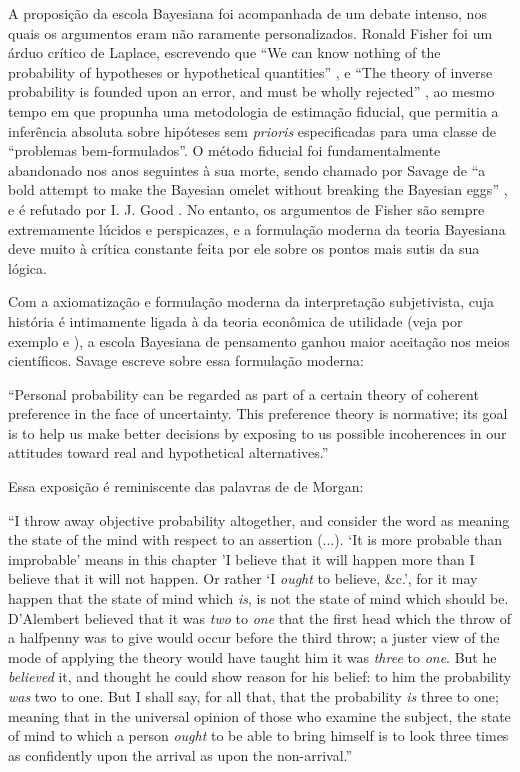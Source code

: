 A proposição da escola Bayesiana foi acompanhada de um debate intenso, nos quais os argumentos eram não raramente personalizados.
Ronald Fisher foi um árduo crítico
de Laplace, escrevendo que ``We can know nothing of the probability of hypotheses or hypothetical quantities'' \citep{Fisher1921},
e ``The theory of inverse probability is founded upon an error, and must be wholly rejected'' \citep{Fisher1925}, ao mesmo tempo
em que propunha uma metodologia de estimação fiducial, que permitia a inferência absoluta sobre hipóteses sem {\em prioris} 
especificadas para uma classe de ``problemas bem-formulados''. O método fiducial foi fundamentalmente abandonado nos anos 
seguintes à sua morte, sendo chamado por Savage de ``a bold attempt to make the Bayesian omelet without
breaking the Bayesian eggs'' \citep{Savage60}, e é refutado por I. J. Good \citep{Good92}. No entanto, os argumentos de Fisher
são sempre extremamente lúcidos e perspicazes, e a formulação moderna da teoria Bayesiana deve muito à crítica constante
feita por ele sobre os pontos mais sutis da sua lógica.

Com a axiomatização e formulação moderna da interpretação subjetivista, cuja história é intimamente ligada à da teoria
econômica de utilidade (veja por exemplo \citep{Friedman48} e \citep{Pfanzagl67}),
a escola Bayesiana de pensamento ganhou maior aceitação nos meios científicos. Savage escreve sobre essa formulação moderna:

``Personal probability can be regarded as part of a certain theory of coherent preference in the face of uncertainty. This
preference theory is normative; its goal is to help us make better decisions by exposing to us possible incoherences in our
attitudes toward real and hypothetical alternatives.'' \citep{Savage67}

Essa exposição é reminiscente das palavras de de Morgan:

``I throw away objective probability altogether, and consider the word as meaning the state of the mind with respect to an 
assertion (...). `It is more probable than improbable' means in this chapter 'I believe that it will happen more than I 
believe that it will not happen. Or rather `I {\em ought} to believe, \&c.', for it may happen that the state of mind which {\em
is}, is not the state of mind which should be. 
D'Alembert believed that it was {\em two} to {\em one} that the first head which the throw of a halfpenny was to give would occur
before the third throw; a juster view of the mode of applying the theory would have taught him it was {\em three} to {\em one}.
But he {\em believed} it, and thought he could show reason for his belief: to him the probability {\em was} two to one. But 
I shall say, for all that, that the probability {\em is} three to one; meaning that in the universal opinion of those who
examine the subject, the state of mind to which a person {\em ought} to be able to bring himself is to look three times
as confidently upon the arrival as upon the non-arrival.''\citep{deMorgan1847}


